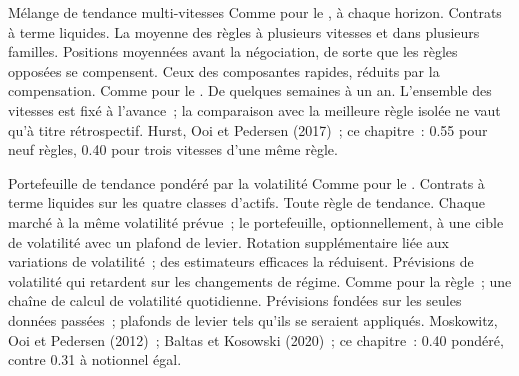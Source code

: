 \begin{strategyfile}{Mélange de tendance multi-vitesses}\label{strat:s1:trend-following:blend}
 Comme pour le , à chaque horizon.
 Contrats à terme liquides.
 La moyenne des règles à plusieurs vitesses et dans plusieurs familles.
 Positions moyennées avant la négociation, de sorte que les règles opposées se compensent.
 Ceux des composantes rapides, réduits par la compensation.
 Comme pour le .
 De quelques semaines à un an.
 L'ensemble des vitesses est fixé à l'avance~; la comparaison avec la meilleure règle isolée ne vaut qu'à titre rétrospectif.
 Hurst, Ooi et Pedersen (2017)~; ce chapitre~: 0.55 pour neuf règles, 0.40 pour trois vitesses d'une même règle.
\end{strategyfile}

\begin{strategyfile}{Portefeuille de tendance pondéré par la volatilité}\label{strat:s1:trend-following:volscaled}
 Comme pour le .
 Contrats à terme liquides sur les quatre classes d'actifs.
 Toute règle de tendance.
 Chaque marché à la même volatilité prévue~; le portefeuille, optionnellement, à une cible de volatilité avec un plafond de levier.
 Rotation supplémentaire liée aux variations de volatilité~; des estimateurs efficaces la réduisent.
 Prévisions de volatilité qui retardent sur les changements de régime.
 Comme pour la règle~; une chaîne de calcul de volatilité quotidienne.
 Prévisions fondées sur les seules données passées~; plafonds de levier tels qu'ils se seraient appliqués.
 Moskowitz, Ooi et Pedersen (2012)~; Baltas et Kosowski (2020)~; ce chapitre~: 0.40 pondéré, contre 0.31 à notionnel égal.
\end{strategyfile}

